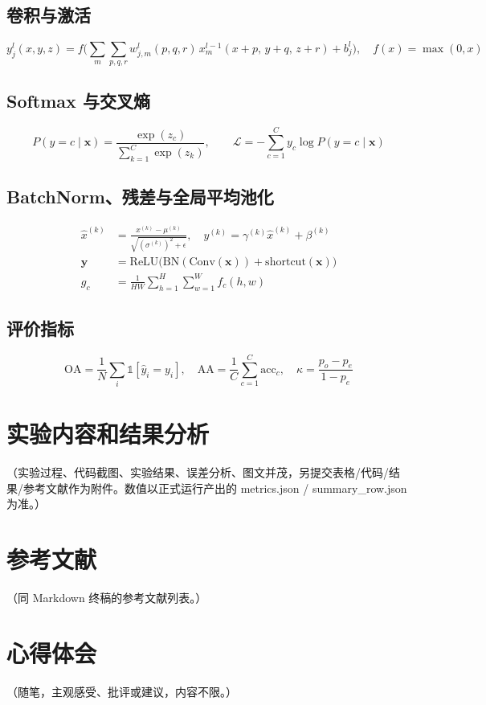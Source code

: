 \documentclass[12pt,a4paper]{article}
\begin{document}
\subsection{卷积与激活}
\begin{equation}
y_{j}^{l}(x,y,z) = f\Big( \sum_{m} \sum_{p,q,r} w_{j,m}^{l}(p,q,r)\, x_{m}^{l-1}(x+p,\, y+q,\, z+r) + b_j^l \Big),\quad
f(x)=\max(0,x)
\end{equation}

\subsection{Softmax 与交叉熵}
\begin{equation}
P(y=c \mid \mathbf{x}) = \frac{\exp(z_c)}{\sum_{k=1}^{C}\exp(z_k)},\qquad
\mathcal{L} = -\sum_{c=1}^{C} y_c \log P(y=c \mid \mathbf{x})
\end{equation}

\subsection{BatchNorm、残差与全局平均池化}
\begin{align}
\hat{x}^{(k)} &= \frac{x^{(k)} - \mu^{(k)}}{\sqrt{(\sigma^{(k)})^2 + \epsilon}},\quad y^{(k)}=\gamma^{(k)}\hat{x}^{(k)}+\beta^{(k)} \\
\mathbf{y} &= \mathrm{ReLU}\big(\mathrm{BN}(\mathrm{Conv}(\mathbf{x})) + \mathrm{shortcut}(\mathbf{x})\big) \\
g_c &= \frac{1}{HW}\sum_{h=1}^{H}\sum_{w=1}^{W} f_c(h,w)
\end{align}

\subsection{评价指标}
\begin{equation}
\mathrm{OA}=\frac{1}{N}\sum_i \mathbb{1}[\hat{y}_i=y_i],\quad
\mathrm{AA}=\frac{1}{C}\sum_{c=1}^{C}\mathrm{acc}_c,\quad
\kappa=\frac{p_o-p_e}{1-p_e}
\end{equation}

\section{实验内容和结果分析}
（实验过程、代码截图、实验结果、误差分析、图文并茂，另提交表格/代码/结果/参考文献作为附件。数值以正式运行产出的 metrics.json / summary_row.json 为准。）

\section{参考文献}
（同 Markdown 终稿的参考文献列表。）

\section{心得体会}
（随笔，主观感受、批评或建议，内容不限。）
\end{document}
